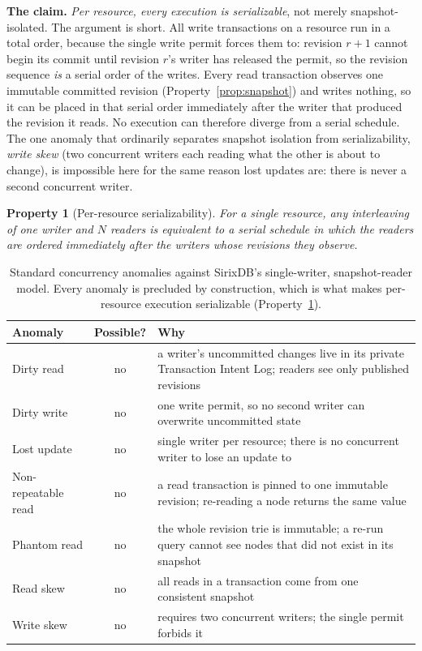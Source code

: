 \documentclass[11pt,a4paper,oneside]{report}
\theoremstyle{sirixthm}
\newtheorem{property}{Property}[chapter]
\begin{document}
\textbf{The claim.} \emph{Per resource, every execution is serializable}, not merely snapshot-isolated.
The argument is short. All write transactions on a resource run in a total order, because the single
write permit forces them to: revision $r{+}1$ cannot begin its commit until revision $r$'s writer has
released the permit, so the revision sequence \emph{is} a serial order of the writes. Every read
transaction observes one immutable committed revision (Property~\ref{prop:snapshot}) and writes nothing,
so it can be placed in that serial order immediately after the writer that produced the revision it
reads. No execution can therefore diverge from a serial schedule. The one anomaly that ordinarily
separates snapshot isolation from serializability, \emph{write skew} (two concurrent writers each
reading what the other is about to change), is impossible here for the same reason lost updates are:
there is never a second concurrent writer.

\begin{property}[Per-resource serializability]\label{prop:serializable}
For a single resource, any interleaving of one writer and $N$ readers is equivalent to a serial schedule
in which the readers are ordered immediately after the writers whose revisions they observe.
\end{property}

\begin{table}[h]
\centering\small\setlength{\tabcolsep}{5pt}\renewcommand{\arraystretch}{1.25}
\begin{tabularx}{\linewidth}{@{}l c X@{}}
\toprule
\textbf{Anomaly} & \textbf{Possible?} & \textbf{Why}\\
\midrule
Dirty read & no & a writer's uncommitted changes live in its private Transaction Intent Log; readers see only published revisions\\
Dirty write & no & one write permit, so no second writer can overwrite uncommitted state\\
Lost update & no & single writer per resource; there is no concurrent writer to lose an update to\\
Non-repeatable read & no & a read transaction is pinned to one immutable revision; re-reading a node returns the same value\\
Phantom read & no & the whole revision trie is immutable; a re-run query cannot see nodes that did not exist in its snapshot\\
Read skew & no & all reads in a transaction come from one consistent snapshot\\
Write skew & no & requires two concurrent writers; the single permit forbids it\\
\bottomrule
\end{tabularx}
\caption{Standard concurrency anomalies against SirixDB's single-writer, snapshot-reader model. Every
anomaly is precluded by construction, which is what makes per-resource execution serializable
(Property~\ref{prop:serializable}).}
\label{tab:anomalies}
\end{table}
\end{document}
